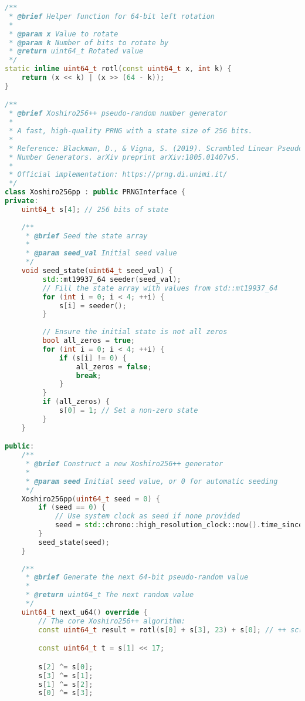 \begin{lstlisting}[language=C++, caption=Xoshiro256++ Implementation (Header)]
/**
 * @brief Helper function for 64-bit left rotation
 * 
 * @param x Value to rotate
 * @param k Number of bits to rotate by
 * @return uint64_t Rotated value
 */
static inline uint64_t rotl(const uint64_t x, int k) {
    return (x << k) | (x >> (64 - k));
}

/**
 * @brief Xoshiro256++ pseudo-random number generator
 * 
 * A fast, high-quality PRNG with a state size of 256 bits.
 * 
 * Reference: Blackman, D., & Vigna, S. (2019). Scrambled Linear Pseudorandom 
 * Number Generators. arXiv preprint arXiv:1805.01407v5.
 * 
 * Official implementation: https://prng.di.unimi.it/
 */
class Xoshiro256pp : public PRNGInterface {
private:
    uint64_t s[4]; // 256 bits of state
    
    /**
     * @brief Seed the state array
     * 
     * @param seed_val Initial seed value
     */
    void seed_state(uint64_t seed_val) {
         std::mt19937_64 seeder(seed_val);
         // Fill the state array with values from std::mt19937_64
         for (int i = 0; i < 4; ++i) {
             s[i] = seeder();
         }
         
         // Ensure the initial state is not all zeros
         bool all_zeros = true;
         for (int i = 0; i < 4; ++i) {
             if (s[i] != 0) {
                 all_zeros = false;
                 break;
             }
         }
         if (all_zeros) {
             s[0] = 1; // Set a non-zero state
         }
    }

public:
    /**
     * @brief Construct a new Xoshiro256++ generator
     * 
     * @param seed Initial seed value, or 0 for automatic seeding
     */
    Xoshiro256pp(uint64_t seed = 0) {
        if (seed == 0) {
            // Use system clock as seed if none provided
            seed = std::chrono::high_resolution_clock::now().time_since_epoch().count();
        }
        seed_state(seed);
    }
    
    /**
     * @brief Generate the next 64-bit pseudo-random value
     * 
     * @return uint64_t The next random value
     */
    uint64_t next_u64() override {
        // The core Xoshiro256++ algorithm:
        const uint64_t result = rotl(s[0] + s[3], 23) + s[0]; // ++ scrambler part

        const uint64_t t = s[1] << 17;

        s[2] ^= s[0];
        s[3] ^= s[1];
        s[1] ^= s[2];
        s[0] ^= s[3];


\end{lstlisting}
